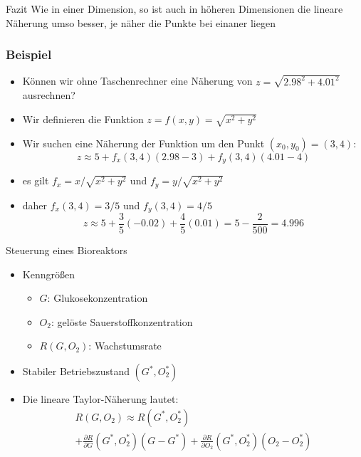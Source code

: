 \begin{frame}
    \begin{block}{Fazit}
    Wie in einer Dimension, so ist auch in höheren Dimensionen die
    lineare Näherung umso besser, je näher die Punkte bei einaner
    liegen
  \end{block}
\end{frame}

\begin{frame}
    \frametitle<presentation>{Beispiel}
    \begin{itemize}
        \item Können wir ohne Taschenrechner eine Näherung von $z=\sqrt{2.98^2+4.01^2}$ ausrechnen?
        \item Wir definieren die Funktion $z=f(x,y)= \sqrt{x^2+y^2}$
        \item Wir suchen eine Näherung der Funktion um den Punkt $(x_0,y_0)=(3,4)$:
        $$
        z \approx 5+ f_x(3,4)(2.98-3) + f_y(3,4)(4.01-4)
        $$
        \item es gilt $f_x = x/\sqrt{x^2+y^2}$ und $f_y = y/\sqrt{x^2+y^2}$
        \item daher $f_x(3,4) = 3/5$ und $f_y(3,4) = 4/5$
        $$
        z\approx 5 + \frac{3}{5}(-0.02) + \frac{4}{5}(0.01) = 5-\frac{2}{500} = 4.996
            $$
    \end{itemize}
\end{frame}

\begin{frame}{Steuerung eines Bioreaktors}
  \begin{itemize}
  \item Kenngrößen
    \begin{itemize}
    \item \(G\): Glukosekonzentration
    \item \(O_2\): gelöste Sauerstoffkonzentration
    \item \(R(G,O_2)\): Wachstumsrate    
    \end{itemize}
  \item Stabiler Betriebszustand \((G^*, O_2^*)\)
  \item Die lineare Taylor-Näherung lautet:
    \begin{multline*}
      R(G, O_2)
      \approx
      R(G^*, O_2^*)\\
      +
      \frac{\partial R}{\partial G}(G^*, O_2^*)
      \left(G - G^*\right)
      +
      \frac{\partial R}{\partial O_2}(G^*, O_2^*)
      \left(O_2 - O_2^*\right)
    \end{multline*}
  \end{itemize}
\end{frame}


